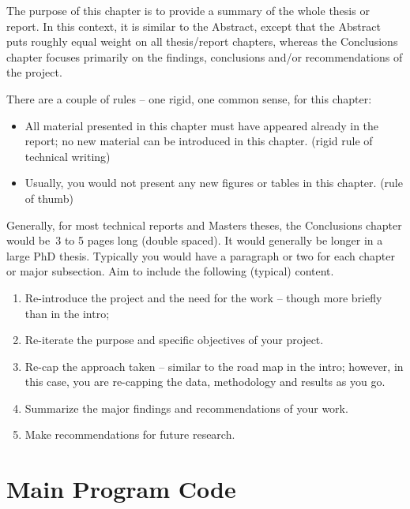 \documentclass{swfcthesis}
\begin{document}
{ The purpose of this chapter is to provide a summary of the
  whole thesis or report.  In this context, it is similar to the Abstract, except that the
  Abstract puts roughly equal weight on all thesis/report chapters, whereas the
  Conclusions chapter focuses primarily on the findings, conclusions and/or
  recommendations of the project.

  There are a couple of rules – one rigid, one common sense, for this chapter:
  \begin{itemize}
  \item All material presented in this chapter must have appeared already in the report;
    no new material can be introduced in this chapter. (rigid rule of technical writing)
  \item Usually, you would not present any new figures or tables in this chapter. (rule of thumb)
  \end{itemize}

  Generally, for most technical reports and Masters theses, the Conclusions chapter would
  be~3 to 5 pages long (double spaced).  It would generally be longer in a large PhD
  thesis. Typically you would have a paragraph or two for each chapter or major
  subsection.  Aim to include the following (typical) content.
  \begin{enumerate}
  \item Re-introduce the project and the need for the work – though more briefly than in
    the intro;
  \item Re-iterate the purpose and specific objectives of your project.
  \item Re-cap the approach taken – similar to the road map in the intro; however, in this
    case, you are re-capping the data, methodology and results as you go.
  \item Summarize the major findings and recommendations of your work.
  \item Make recommendations for future research.
  \end{enumerate}}


\appendix{}
\maketailpages{} %


\chapter{Main Program Code} %
\end{document}
